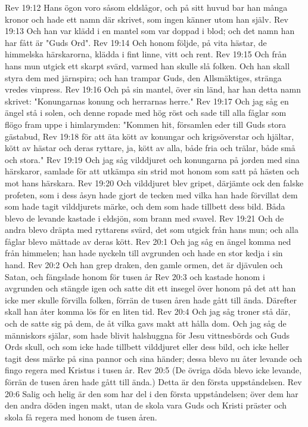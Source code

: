 Rev 19:12  Hans ögon voro såsom eldslågor, och på sitt huvud bar han många kronor och hade ett namn där skrivet, som ingen känner utom han själv.
Rev 19:13  Och han var klädd i en mantel som var doppad i blod; och det namn han har fått är "Guds Ord".
Rev 19:14  Och honom följde, på vita hästar, de himmelska härskarorna, klädda i fint linne, vitt och rent.
Rev 19:15  Och från hans mun utgick ett skarpt svärd, varmed han skulle slå folken. Och han skall styra dem med järnspira; och han trampar Guds, den Allsmäktiges, stränga vredes vinpress.
Rev 19:16  Och på sin mantel, över sin länd, har han detta namn skrivet: "Konungarnas konung och herrarnas herre."
Rev 19:17  Och jag såg en ängel stå i solen, och denne ropade med hög röst och sade till alla fåglar som flögo fram uppe i himlarymden: "Kommen hit, församlen eder till Guds stora gästabud,
Rev 19:18  för att äta kött av konungar och krigsöverstar och hjältar, kött av hästar och deras ryttare, ja, kött av alla, både fria och trälar, både små och stora."
Rev 19:19  Och jag såg vilddjuret och konungarna på jorden med sina härskaror, samlade för att utkämpa sin strid mot honom som satt på hästen och mot hans härskara.
Rev 19:20  Och vilddjuret blev gripet, därjämte ock den falske profeten, som i dess åsyn hade gjort de tecken med vilka han hade förvillat dem som hade tagit vilddjurets märke, och dem som hade tillbett dess bild. Båda blevo de levande kastade i eldsjön, som brann med svavel.
Rev 19:21  Och de andra blevo dräpta med ryttarens svärd, det som utgick från hans mun; och alla fåglar blevo mättade av deras kött.
Rev 20:1  Och jag såg en ängel komma ned från himmelen; han hade nyckeln till avgrunden och hade en stor kedja i sin hand.
Rev 20:2  Och han grep draken, den gamle ormen, det är djävulen och Satan, och fängslade honom för tusen år
Rev 20:3  och kastade honom i avgrunden och stängde igen och satte dit ett insegel över honom på det att han icke mer skulle förvilla folken, förrän de tusen åren hade gått till ända. Därefter skall han åter komma lös för en liten tid.
Rev 20:4  Och jag såg troner stå där, och de satte sig på dem, de åt vilka gavs makt att hålla dom. Och jag såg de människors själar, som hade blivit halshuggna för Jesu vittnesbörds och Guds Ords skull, och som icke hade tillbett vilddjuret eller dess bild, och icke heller tagit dess märke på sina pannor och sina händer; dessa blevo nu åter levande och fingo regera med Kristus i tusen år.
Rev 20:5  (De övriga döda blevo icke levande, förrän de tusen åren hade gått till ända.) Detta är den första uppståndelsen.
Rev 20:6  Salig och helig är den som har del i den första uppståndelsen; över dem har den andra döden ingen makt, utan de skola vara Guds och Kristi präster och skola få regera med honom de tusen åren.
